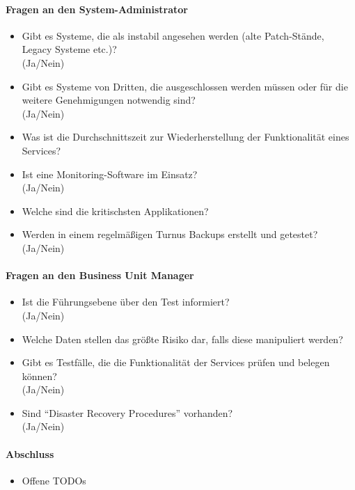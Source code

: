 \paragraph{Fragen an den System-Administrator}
\begin{itemize}
\item Gibt es Systeme, die als instabil angesehen werden (alte Patch-Stände, Legacy Systeme etc.)?\\
(Ja/Nein)
\item Gibt es Systeme von Dritten, die ausgeschlossen werden müssen oder für die weitere Genehmigungen notwendig sind?\\
(Ja/Nein)
\item Was ist die Durchschnittszeit zur Wiederherstellung der Funktionalität eines Services?
\item Ist eine Monitoring-Software im Einsatz?\\
(Ja/Nein)
\item Welche sind die kritischsten Applikationen?
\item Werden in einem regelmäßigen Turnus Backups erstellt und getestet?\\
(Ja/Nein)
\end{itemize}

\paragraph{Fragen an den Business Unit Manager}
\begin{itemize}
\item Ist die Führungsebene über den Test informiert?\\
(Ja/Nein)
\item Welche Daten stellen das größte Risiko dar, falls diese manipuliert werden?
\item Gibt es Testfälle, die die Funktionalität der Services prüfen und belegen können?\\
(Ja/Nein)
\item Sind "`Disaster Recovery Procedures"' vorhanden?\\
(Ja/Nein)
\end{itemize}

\paragraph{Abschluss}
\begin{itemize}
\item Offene TODOs
\end{itemize}
	
